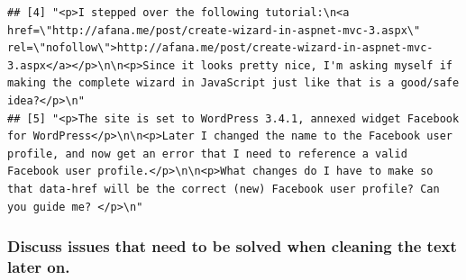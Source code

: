 \documentclass[
]{article}
\begin{document}
\begin{verbatim}
## [4] "<p>I stepped over the following tutorial:\n<a href=\"http://afana.me/post/create-wizard-in-aspnet-mvc-3.aspx\" rel=\"nofollow\">http://afana.me/post/create-wizard-in-aspnet-mvc-3.aspx</a></p>\n\n<p>Since it looks pretty nice, I'm asking myself if making the complete wizard in JavaScript just like that is a good/safe idea?</p>\n"                                                                                                                                                                                                                                                                                                                                                                                                                                                                                                                                                                                                                                                                                                                                                                                                                                                                                                                                                                                                                                                                                                                                                                                                                                                                                                                               
## [5] "<p>The site is set to WordPress 3.4.1, annexed widget Facebook for WordPress</p>\n\n<p>Later I changed the name to the Facebook user profile, and now get an error that I need to reference a valid Facebook user profile.</p>\n\n<p>What changes do I have to make so that data-href will be the correct (new) Facebook user profile? Can you guide me? </p>\n"
\end{verbatim}

\hypertarget{discuss-issues-that-need-to-be-solved-when-cleaning-the-text-later-on.}{%
\subsubsection{Discuss issues that need to be solved when cleaning the
text later
on.}\label{discuss-issues-that-need-to-be-solved-when-cleaning-the-text-later-on.}}
\end{document}

